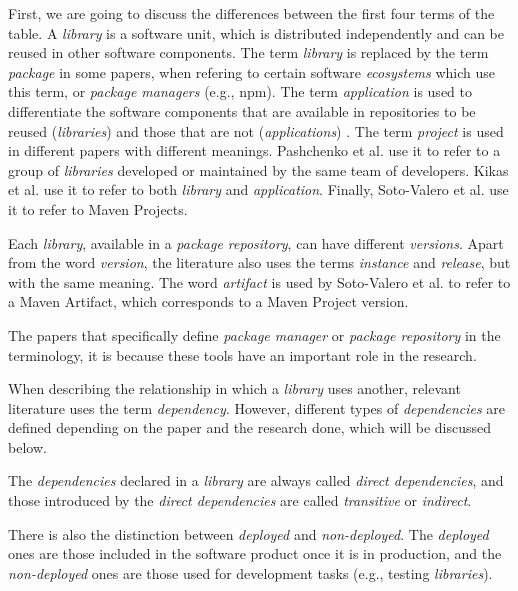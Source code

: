 \blankls
First, we are going to discuss the differences between the first four terms of the table. A \textit{library} is a software unit, which is distributed independently and can be reused in other software components. The term \textit{library} is replaced by the term \textit{package} in some papers, when refering to certain software \textit{ecosystems} which use this term, or \textit{package managers} (e.g., npm). The term \textit{application} is used to differentiate the software components that are available in repositories to be reused (\textit{libraries}) and those that are not (\textit{applications}) \cite{kikas2017structure}.
The term \textit{project} is used in different papers with different meanings. Pashchenko et al. \cite{pashchenko2018vulnerable} use it to refer to a group of \textit{libraries} developed or maintained by the same team of developers. Kikas et al. \cite{kikas2017structure} use it to refer to both \textit{library} and \textit{application}. Finally, Soto-Valero et al. use it to refer to Maven Projects.

Each \textit{library}, available in a \textit{package repository}, can have different \textit{versions}. Apart from the word \textit{version}, the literature also uses the terms \textit{instance} and \textit{release}, but with the same meaning. The word \textit{artifact} is used by Soto-Valero et al. \cite{soto2020comprehensive} to refer to a Maven Artifact, which corresponds to a Maven Project version.

The papers that specifically define \textit{package manager} or \textit{package repository} in the terminology, it is because these tools have an important role in the research.

When describing the relationship in which a \textit{library} uses another, relevant literature uses the term \textit{dependency}. However, different types of \textit{dependencies} are defined depending on the paper and the research done, which will be discussed below.

The \textit{dependencies} declared in a \textit{library} are always called \textit{direct dependencies}, and those introduced by the \textit{direct dependencies} are called \textit{transitive} or \textit{indirect}.

There is also the distinction between \textit{deployed} and \textit{non-deployed}. The \textit{deployed} ones are those included in the software product once it is in production, and the \textit{non-deployed} ones are those used for development tasks (e.g., testing \textit{libraries}).

